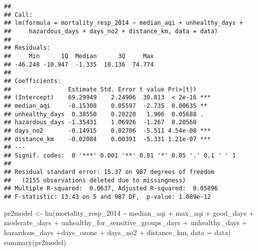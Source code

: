\documentclass[
]{article}
\newenvironment{Shaded}{\begin{snugshade}}{\end{snugshade}}
\newcommand{\AttributeTok}[1]{\textcolor[rgb]{0.77,0.63,0.00}{#1}}
\newcommand{\FunctionTok}[1]{\textcolor[rgb]{0.00,0.00,0.00}{#1}}
\newcommand{\NormalTok}[1]{#1}
\newcommand{\OtherTok}[1]{\textcolor[rgb]{0.56,0.35,0.01}{#1}}
\newcommand{\SpecialCharTok}[1]{\textcolor[rgb]{0.00,0.00,0.00}{#1}}
\begin{document}
\begin{verbatim}
## 
## Call:
## lm(formula = mortality_resp_2014 ~ median_aqi + unhealthy_days + 
##     hazardous_days + days_no2 + distance_km, data = data)
## 
## Residuals:
##     Min      1Q  Median      3Q     Max 
## -46.248 -10.947  -1.335  10.136  74.774 
## 
## Coefficients:
##                Estimate Std. Error t value Pr(>|t|)    
## (Intercept)    69.29949    2.24906  30.813  < 2e-16 ***
## median_aqi     -0.15308    0.05597  -2.735  0.00635 ** 
## unhealthy_days  0.38550    0.20220   1.906  0.05688 .  
## hazardous_days -1.35431    1.06926  -1.267  0.20560    
## days_no2       -0.14915    0.02706  -5.511 4.54e-08 ***
## distance_km    -0.02084    0.00391  -5.331 1.21e-07 ***
## ---
## Signif. codes:  0 '***' 0.001 '**' 0.01 '*' 0.05 '.' 0.1 ' ' 1
## 
## Residual standard error: 15.37 on 987 degrees of freedom
##   (2155 observations deleted due to missingness)
## Multiple R-squared:  0.0637, Adjusted R-squared:  0.05896 
## F-statistic: 13.43 on 5 and 987 DF,  p-value: 1.089e-12
\end{verbatim}

\begin{Shaded}
\begin{Highlighting}[]
\NormalTok{pr2model }\OtherTok{\textless{}{-}} \FunctionTok{lm}\NormalTok{(mortality\_resp\_2014 }\SpecialCharTok{\textasciitilde{}}\NormalTok{ median\_aqi }\SpecialCharTok{+}\NormalTok{ max\_aqi }\SpecialCharTok{+}\NormalTok{ good\_days }\SpecialCharTok{+}\NormalTok{ moderate\_days }\SpecialCharTok{+}\NormalTok{ unhealthy\_for\_sensitive\_groups\_days }\SpecialCharTok{+}\NormalTok{ unhealthy\_days }\SpecialCharTok{+}\NormalTok{ hazardous\_days }\SpecialCharTok{+}\NormalTok{days\_ozone }\SpecialCharTok{+}\NormalTok{ days\_no2 }\SpecialCharTok{+}\NormalTok{ distance\_km, }\AttributeTok{data =}\NormalTok{ data)}
\FunctionTok{summary}\NormalTok{(pr2model)}
\end{Highlighting}
\end{Shaded}
\end{document}
